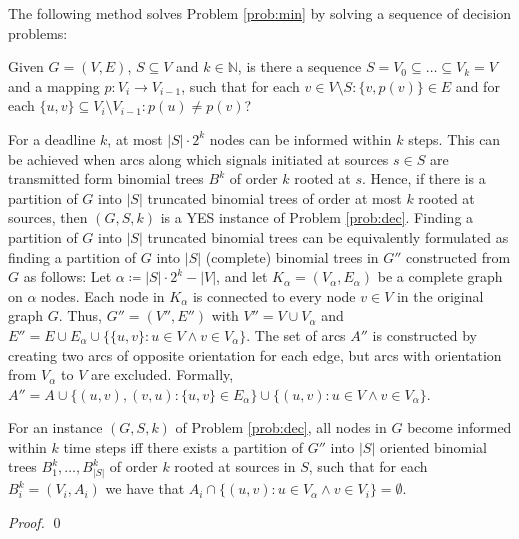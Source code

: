 The following method solves Problem \ref{prob:min} by solving a sequence of decision problems:
\begin{problem}
\label{prob:dec}
Given $G=(V,E)$, $S\subseteq V$ and $k\in \mathbb{N}$, is there a sequence $S=V_0\subseteq\dots\subseteq V_k=V$ and a mapping $p:V_i\to V_{i-1}$, such that for each $v\in V\setminus S:\{v,p(v)\}\in E$ and for each $\{u,v\}\subseteq V_i\setminus V_{i-1}: p(u)\neq p(v)$?
\end{problem}
For a deadline $k$, at most $|S|\cdot 2^k$ nodes can be informed within $k$ steps. 
This can be achieved when arcs along which signals initiated at sources $s\in S$ are transmitted form binomial trees $B^k$ of order $k$ rooted at $s$.
Hence, if there is a partition of $G$ into $|S|$ truncated binomial trees of order at most $k$ rooted at sources, then $(G,S,k)$ is a YES instance of Problem \ref{prob:dec}.
Finding a partition of $G$ into $|S|$ truncated binomial trees can be equivalently formulated as finding a partition of $G$ into $|S|$ (complete) binomial trees in $G''$ constructed from $G$ as follows:
Let $\alpha\coloneqq |S|\cdot 2^k-|V|$, and let $K_\alpha=(V_\alpha,E_\alpha)$ be a complete graph on $\alpha$ nodes.
Each node in $K_\alpha$ is connected to every node $v\in V$ in the original graph $G$.
Thus, $G''=(V'',E'')$ with $V''=V\cup V_\alpha$ and $E''=E\cup E_\alpha\cup \{\{u,v\}: u\in V \wedge v\in V_\alpha\}$.
The set of arcs $A''$ is constructed by creating two arcs of opposite orientation for each edge, but arcs with orientation from $V_\alpha$ to $V$ are excluded. 
Formally, $A''=A\cup\{(u,v),(v,u): \{u,v\}\in E_\alpha\}\cup\{(u,v):u\in V \wedge v\in V_\alpha\}$.
\begin{proposition}
\label{lem:probeq}
For an instance $(G,S,k)$ of Problem \ref{prob:dec}, all nodes in $G$ become informed within $k$ time steps iff 
there exists a partition of $G''$ into $|S|$ oriented binomial trees $B^k_1,\dots,B^k_{|S|}$ of order $k$ rooted at sources in $S$,
such that for each $B^k_i=(V_i,A_i)$ we have that $A_i\cap\{(u,v):u \in V_\alpha \wedge v\in V_i\}=\emptyset$. 
\end{proposition}
\begin{proof}
\qed
\end{proof}

